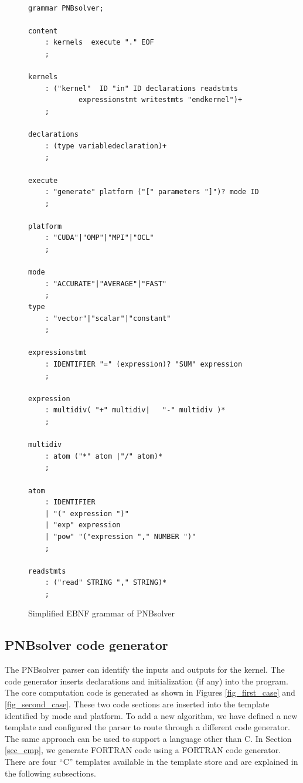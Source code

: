 \documentclass[draftclsnofoot]{elsarticle}
\begin{document}
\begin{figure}[!t]
\centering
\begin{lstlisting}[style=AMMA, language=PNB]

grammar PNBsolver;

content
	: kernels  execute "." EOF 
	;

kernels
	: ("kernel"  ID "in" ID declarations readstmts 
            expressionstmt writestmts "endkernel")+
	;

declarations
	: (type variabledeclaration)+
	;

execute 
	: "generate" platform ("[" parameters "]")? mode ID
	;

platform
	: "CUDA"|"OMP"|"MPI"|"OCL"
	;

mode
	: "ACCURATE"|"AVERAGE"|"FAST"
	; 
type
	: "vector"|"scalar"|"constant"
	;  
            
expressionstmt
	: IDENTIFIER "=" (expression)? "SUM" expression 
	;

expression
	: multidiv( "+" multidiv|   "-" multidiv )* 
	;

multidiv
	: atom ("*" atom |"/" atom)* 
	; 

atom
	: IDENTIFIER
	| "(" expression ")"
	| "exp" expression 
	| "pow" "("expression "," NUMBER ")" 
	;
           
readstmts
	: ("read" STRING "," STRING)*
	;
\end{lstlisting}
\caption{Simplified EBNF grammar of PNBsolver}
\label{fig_grmr}
\end{figure}

\subsection{PNBsolver code generator}
The PNBsolver parser can identify the inputs and outputs for the kernel. The code generator inserts declarations and initialization (if any) into the program. The core computation
code is generated as shown in Figures \ref{fig_first_case} and \ref{fig_second_case}. These two code sections are inserted into the template identified by mode and 
platform. To add a new algorithm, we have
defined a new template and configured the parser to route through a different code generator. The same approach can be used to support a language other than C. In Section \ref{sec_cmp},
we generate FORTRAN code using a FORTRAN code generator. There are four ``C'' templates available in the template store and are  explained in the following subsections. 
\end{document}
